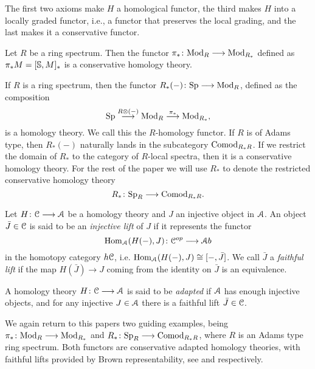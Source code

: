 \begin{remark}
    The first two axioms make $H$ a homological functor, the third makes $H$ into a locally graded functor, i.e., a functor that preserves the local grading, and the last makes it a conservative functor. 
\end{remark}

\begin{example}
    Let $R$ be a ring spectrum. Then the functor $\pi_*\: \Mod_R\longrightarrow \Mod_{R_*}$ defined as $\pi_* M = [\S, M]_*$ is a conservative homology theory. 
\end{example}

\begin{example}
    If $R$ is a ring spectrum, then the functor $R_*(-)\: \Sp \longrightarrow \Mod_R$, defined as the composition 
    \[\Sp\overset{R\otimes (-)}\longrightarrow \Mod_R \overset{\pi_*}\longrightarrow \Mod_{R_*},\]
    is a homology theory. We call this the $R$-homology functor. If $R$ is of Adams type, then $R_*(-)$ naturally lands in the subcategory $\Comod_{R_*R}$. If we restrict the domain of $R_*$ to the category of $R$-local spectra, then it is a conservative homology theory. For the rest of the paper we will use $R_*$ to denote the restricted conservative homology theory 
    \[R_*\: \Sp_R\to \Comod_{R_*R}.\]
\end{example}

\begin{definition}
    \label{ch1:def:faithful-lift}
    Let $H\: \C\longrightarrow \A$ be a homology theory and $J$ an injective object in $\A$. An object $\bar{J}\in \C$ is said to be an \emph{injective lift} of $J$ if it represents the functor 
    \[\Hom_\A(H(-),J)\: \C^{op}\longrightarrow \A b\]
    in the homotopy category $h \C$, i.e. $\Hom_\A(H(-),J)\cong [-,\bar{J}]$. We call $\bar{J}$ a \emph{faithful lift} if the map $H(\bar{J})\longrightarrow J$ coming from the identity on $\bar{J}$ is an equivalence. 
\end{definition}

\begin{definition}
    \label{ch1:def:adapted-homology-theory}
    A homology theory $H\: \C\longrightarrow \A$ is said to be \emph{adapted} if $\A$ has enough injective objects, and for any injective $J \in \A$ there is a faithful lift $\bar{J}\in \C$. 
\end{definition}

\begin{example}
    We again return to this papers two guiding examples, being $\pi_*\: \Mod_R\longrightarrow \Mod_{R_*}$ and $R_*\: \Sp_R\longrightarrow \Comod_{R_*R}$, where $R$ is an Adams type ring spectrum. Both functors are conservative adapted homology theories, with faithful lifts provided by Brown representability, see \cite[8.2]{patchkoria-pstragowski_2021} and \cite[8.13]{patchkoria-pstragowski_2021} respectively. 
\end{example}


